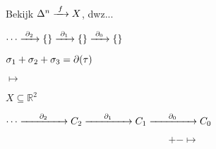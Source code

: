 \documentclass[14pt]{beamer}
\newcommand{\spc}[0]{\hspace{0.5cm}}
\begin{document}
\begin{frame}
	Bekijk $\Delta^n \xrightarrow{\,\,{f}\,\,} X$, dwz...

	\Large $\cdots \xrightarrow{\,\,{\partial_2}\,\,} \{\} \xrightarrow{\,\,{\partial_1}\,\,} \{\} \xrightarrow{\,\,{\partial_0}\,\,} \{\}$

	$ \sigma_1 + \sigma_2 + \sigma_3 = \partial(\tau) $

	$ \mapsto $

	$ X \subseteq \mathbb{R}^2 $
\end{frame}

\begin{frame}
	\large $\cdots \tot{\spc{}\del_2\spc{}} C_2 \tot{\spc{}\del_1\spc{}} C_1 \tot{\spc{}\del_0\spc{}} C_0$

	\large {}

	\tiny $$ + - \mapsto $$
\end{frame}
\end{document}
